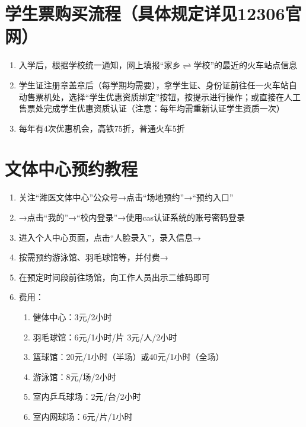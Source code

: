 \section[学生票购买流程（具体规定详见12306官网）]{学生票购买流程（具体规定详见12306官网）}
\begin{enumerate}
    \item 入学后，根据学校统一通知，网上填报“家乡$\rightleftharpoons$学校”的最近的火车站点信息
    \item 学生证注册章盖章后（每学期均需要），拿学生证、身份证前往任一火车站自动售票机处，选择“学生优惠资质绑定”按钮，按提示进行操作；或直接在人工售票处完成学生优惠资质认证（注意：每年均需重新认证学生资质一次）
    \item 每年有4次优惠机会，高铁75折，普通火车5折
\end{enumerate}

\section[文体中心预约教程]{文体中心预约教程}
\label{sports_center}
\begin{enumerate}
    \item 关注“潍医文体中心”公众号→点击“场地预约”→“预约入口”
    \item →点击“我的”→“校内登录”→使用cas认证系统的账号密码登录
    \item 进入个人中心页面，点击“人脸录入”，录入信息→
    \item 按需预约\footnotemark 游泳馆、羽毛球馆等，并付费→
    \item 在预定时间段前往场馆，向工作人员出示二维码\footnotemark 即可
    \item 费用：
    \begin{enumerate}
        \item 健体中心：3元/2小时
        \item 羽毛球馆：6元/1小时/片 3元/人/2小时
        \item 篮球馆：20元/1小时（半场）或40元/1小时（全场）
        \item 游泳馆：8元/场/2小时
        \item 室内乒乓球场：2元/台/2小时
        \item 室内网球场：6元/片/1小时
    \end{enumerate}
\end{enumerate}